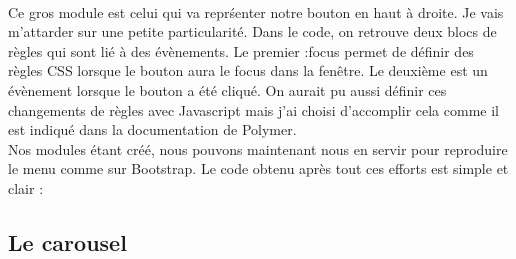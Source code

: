 \documentclass{article}
\begin{document}
\vspace{0.5cm}\\
Ce gros module est celui qui va repr\'senter notre bouton en haut \`a droite. Je vais m'attarder sur une petite particularit\'e. Dans le code, on retrouve deux blocs de r\`egles qui sont li\'e \`a des \'ev\`enements. Le premier \og :focus \fg{} permet de d\'efinir des r\`egles CSS lorsque le bouton aura le focus dans la fen\^etre. Le deuxi\`eme est un \'ev\`enement lorsque le bouton a \'et\'e cliqu\'e. On aurait pu aussi d\'efinir ces changements de r\`egles avec Javascript mais j'ai choisi d'accomplir cela comme il est indiqu\'e dans la documentation de Polymer. 
\vspace{0.5cm}\\
Nos modules \'etant cr\'e\'e, nous pouvons maintenant nous en servir pour reproduire le menu comme sur Bootstrap. Le code obtenu apr\`es tout ces efforts est simple et clair :
\vspace{0.5cm}\\
\subsection{Le carousel}
\end{document}
